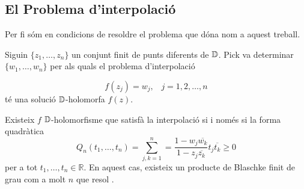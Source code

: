 \documentclass[dvipsnames, svgnames, leqno, a4paper, 12pt]{article}
\begin{document}
\subsection{El Problema d'interpolació}
Per fi sóm en condicions de resoldre el problema que dóna nom a aquest treball.

Siguin $\{z_1,\dots,z_n\}$ un conjunt finit de punts diferents de $\mathbb{D}$. Pick va determinar  $\{w_1,\dots,w_n\}$ per als quals el problema d'interpolació

\begin{equation}\label{eq:interpol}
    f(z_j)=w_j,\, \text{  } j=1,2,\dots,n
\end{equation}
%
té una solució $\mathbb{D}$-holomorfa $f(z)$.

\begin{theorem}[Pick]\label{th:pick}
    Existeix $f$ $\mathbb{D}$-holomorfisme que satisfà la interpolació \normalfont{(\ref{eq:interpol})} si i només si la forma quadràtica 
    \begin{displaymath}
        Q_n(t_1,\dots,t_n)=\sum_{j,k=1}^n=\frac{1-w_j\overline{w_k}}{1-z_j\overline{z_k}}t_j\overline{t_k}\geq0
    \end{displaymath}
    per a tot $t_1,\dots, t_n\in\mathbb{R}$. En aquest cas, existeix un producte de Blaschke finit de grau com a molt $n$ que resol \normalfont{(\ref{eq:interpol})}.
\end{theorem}
\end{document}
